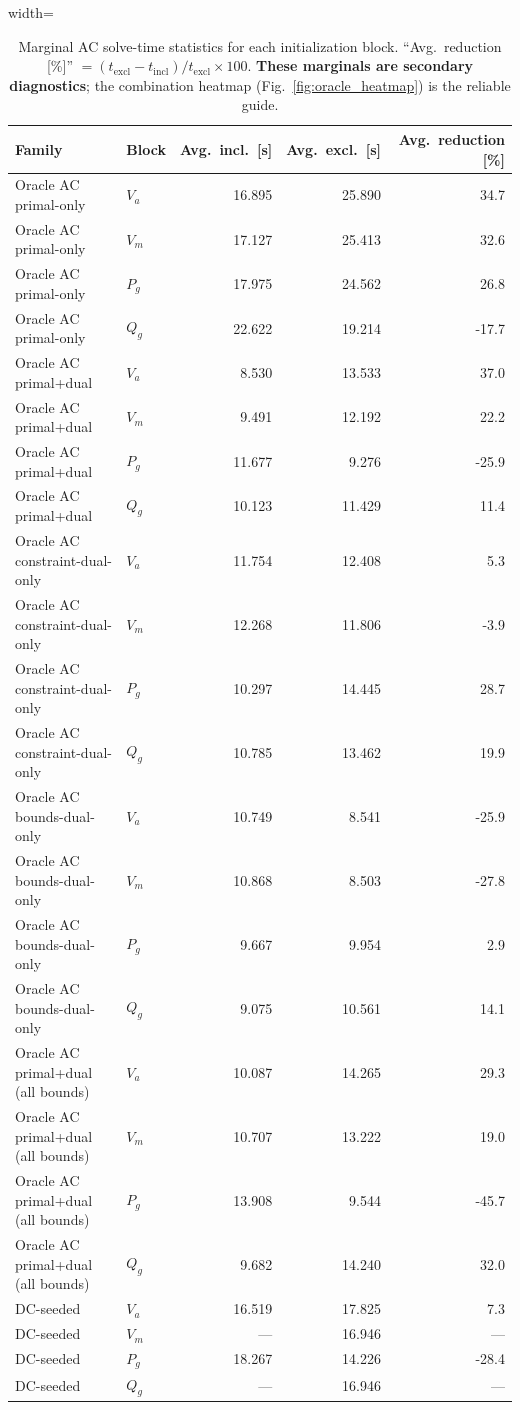\begin{table}[!t]
\centering
\caption{Marginal AC solve-time statistics for each initialization block. ``Avg.\ reduction [\%]'' $= (t_{\text{excl}} - t_{\text{incl}})/t_{\text{excl}} \times 100$. \textbf{These marginals are secondary diagnostics}; the combination heatmap (Fig.~\ref{fig:oracle_heatmap}) is the reliable guide.}
\label{tab:block_effects}
\small
\setlength{\tabcolsep}{5pt}
\begin{adjustbox}{width=\columnwidth}
\begin{tabular}{p{2.7cm}lrrr}
\toprule
Family & Block & Avg.\ incl.\ [s] & Avg.\ excl.\ [s] & Avg.\ reduction [\%] \\
\midrule
Oracle AC primal-only & $V_a$ & 16.895 & 25.890 & 34.7 \\
Oracle AC primal-only & $V_m$ & 17.127 & 25.413 & 32.6 \\
Oracle AC primal-only & $P_g$ & 17.975 & 24.562 & 26.8 \\
Oracle AC primal-only & $Q_g$ & 22.622 & 19.214 & -17.7 \\
\midrule
Oracle AC primal+dual & $V_a$ & 8.530 & 13.533 & 37.0 \\
Oracle AC primal+dual & $V_m$ & 9.491 & 12.192 & 22.2 \\
Oracle AC primal+dual & $P_g$ & 11.677 & 9.276 & -25.9 \\
Oracle AC primal+dual & $Q_g$ & 10.123 & 11.429 & 11.4 \\
\midrule
Oracle AC constraint-dual-only & $V_a$ & 11.754 & 12.408 & 5.3 \\
Oracle AC constraint-dual-only & $V_m$ & 12.268 & 11.806 & -3.9 \\
Oracle AC constraint-dual-only & $P_g$ & 10.297 & 14.445 & 28.7 \\
Oracle AC constraint-dual-only & $Q_g$ & 10.785 & 13.462 & 19.9 \\
\midrule
Oracle AC bounds-dual-only & $V_a$ & 10.749 & 8.541 & -25.9 \\
Oracle AC bounds-dual-only & $V_m$ & 10.868 & 8.503 & -27.8 \\
Oracle AC bounds-dual-only & $P_g$ & 9.667 & 9.954 & 2.9 \\
Oracle AC bounds-dual-only & $Q_g$ & 9.075 & 10.561 & 14.1 \\
\midrule
Oracle AC primal+dual (all bounds) & $V_a$ & 10.087 & 14.265 & 29.3 \\
Oracle AC primal+dual (all bounds) & $V_m$ & 10.707 & 13.222 & 19.0 \\
Oracle AC primal+dual (all bounds) & $P_g$ & 13.908 & 9.544 & -45.7 \\
Oracle AC primal+dual (all bounds) & $Q_g$ & 9.682 & 14.240 & 32.0 \\
\midrule
DC-seeded & $V_a$ & 16.519 & 17.825 & 7.3 \\
DC-seeded & $V_m$ & --- & 16.946 & --- \\
DC-seeded & $P_g$ & 18.267 & 14.226 & -28.4 \\
DC-seeded & $Q_g$ & --- & 16.946 & --- \\
\bottomrule
\end{tabular}
\end{adjustbox}
\end{table}